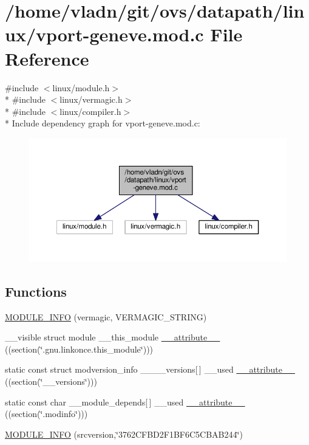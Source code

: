 \hypertarget{vport-geneve_8mod_8c}{}\section{/home/vladn/git/ovs/datapath/linux/vport-\/geneve.mod.\+c File Reference}
\label{vport-geneve_8mod_8c}
{\ttfamily \#include $<$linux/module.\+h$>$}\\*
{\ttfamily \#include $<$linux/vermagic.\+h$>$}\\*
{\ttfamily \#include $<$linux/compiler.\+h$>$}\\*
Include dependency graph for vport-\/geneve.mod.\+c\+:
\nopagebreak
\begin{figure}[H]
\begin{center}
\leavevmode
\includegraphics[width=350pt]{vport-geneve_8mod_8c__incl}
\end{center}
\end{figure}
\subsection*{Functions}
\begin{DoxyCompactItemize}
\item 
\hyperlink{vport-geneve_8mod_8c_a59ae061e50f755cbc9dbde3c6688273a}{M\+O\+D\+U\+L\+E\+\_\+\+I\+N\+F\+O} (vermagic, V\+E\+R\+M\+A\+G\+I\+C\+\_\+\+S\+T\+R\+I\+N\+G)
\item 
\+\_\+\+\_\+visible struct module \+\_\+\+\_\+this\+\_\+module \hyperlink{vport-geneve_8mod_8c_acc22bca8fb9ed0433181b5c98efdb5a4}{\+\_\+\+\_\+attribute\+\_\+\+\_\+} ((section(\char`\"{}.gnu.\+linkonce.\+this\+\_\+module\char`\"{})))
\item 
static const struct modversion\+\_\+info \+\_\+\+\_\+\+\_\+\+\_\+versions\mbox{[}$\,$\mbox{]} \+\_\+\+\_\+used \hyperlink{vport-geneve_8mod_8c_a3457b560a580904370cd8cbaddb0c902}{\+\_\+\+\_\+attribute\+\_\+\+\_\+} ((section(\char`\"{}\+\_\+\+\_\+versions\char`\"{})))
\item 
static const char \+\_\+\+\_\+module\+\_\+depends\mbox{[}$\,$\mbox{]} \+\_\+\+\_\+used \hyperlink{vport-geneve_8mod_8c_aebedc6dfadccd01faf3f462d4fa936f7}{\+\_\+\+\_\+attribute\+\_\+\+\_\+} ((section(\char`\"{}.modinfo\char`\"{})))
\item 
\hyperlink{vport-geneve_8mod_8c_a0c4793e2cea12a2526e180fdf4e10450}{M\+O\+D\+U\+L\+E\+\_\+\+I\+N\+F\+O} (srcversion,\char`\"{}3762\+C\+F\+B\+D2\+F1\+B\+F6\+C5\+C\+B\+A\+B244\char`\"{})
\end{DoxyCompactItemize}


